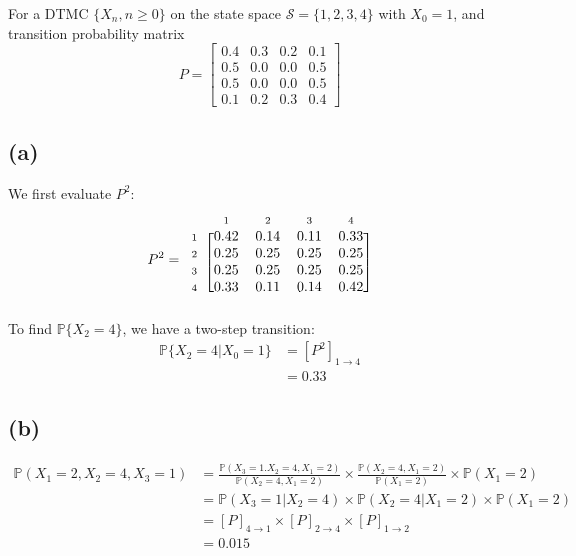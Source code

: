\documentclass[12pt]{article}
\newcommand{\matindex}[1]{\mbox{\scriptsize#1}}%
\begin{document}
For a DTMC $\{X_n, n\geq 0\}$ on the state space $\mathcal{S} = \{1,2,3,4\}$ with $X_0 = 1$, and transition probability matrix \begin{equation}
    P = \begin{bmatrix}
            0.4& 0.3& 0.2& 0.1 \\ 
            0.5&0.0&0.0&0.5 \\ 
            0.5&0.0&0.0&0.5 \\ 
            0.1&0.2&0.3&0.4
    \end{bmatrix}
\end{equation}

\subsection*{(a)}

We first evaluate $P^{2}$: \begin{equation}
    P^{2} = \begin{blockarray}{ccccc}
            & \matindex{1} & \matindex{2} & \matindex{3} &\matindex{4} \\ 
            \begin{block}{c[cccc]}
                \matindex{1} & 0.42 & 0.14 & 0.11 & 0.33 \\ 
                \matindex{2} & 0.25 & 0.25 & 0.25 & 0.25 \\ 
                \matindex{3} & 0.25 & 0.25 & 0.25 & 0.25 \\ 
                \matindex{4} & 0.33 & 0.11 & 0.14 & 0.42 \\
            \end{block}
    \end{blockarray}
\end{equation} To find $ \mathbb{P}\{X_2 = 4\}$, we have a two-step transition: \begin{align*}
    \mathbb{P}\{X_2 = 4 | X_{0} = 1\} &= \left[ P^{2} \right]_{1 \to 4} \\ 
    &= 0.33
\end{align*}

\subsection*{(b)}

\begin{align*}
    \mathbb{P}(X_{1} = 2, X_{2} = 4, X_{3} = 1) &= \frac{ \mathbb{P}(X_{3} = 1. X_{2} = 4, X_{1} = 2)}{ \mathbb{P}(X_{2} = 4, X_{1} = 2)} \times \frac{ \mathbb{P}(X_{2} = 4, X_{1} = 2)}{ \mathbb{P}(X_{1} = 2)} \times \mathbb{P}(X_{1} = 2) \\ 
    &= \mathbb{P}(X_{3} = 1 | X_2 = 4) \times \mathbb{P}(X_{2} = 4 | X_{1} = 2) \times \mathbb{P}(X_{1} = 2) \\ 
    &= \left[ P \right]_{4 \to 1} \times \left[ P \right]_{2 \to 4} \times \left[ P \right]_{1 \to 2} \\ 
    &= 0.015
\end{align*}
\end{document}
